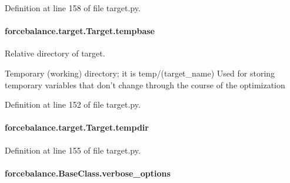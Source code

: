 Definition at line 158 of file target.\-py.

\hypertarget{classforcebalance_1_1target_1_1Target_ae5b544d3e11365865813ef3d626ef81d}{
\paragraph[{tempbase}]{\setlength{\rightskip}{0pt plus 5cm}forcebalance.\-target.\-Target.\-tempbase\hspace{0.3cm}{\ttfamily [inherited]}}}\label{classforcebalance_1_1target_1_1Target_ae5b544d3e11365865813ef3d626ef81d}


Relative directory of target. 

Temporary (working) directory; it is temp/(target\-\_\-name) Used for storing temporary variables that don't change through the course of the optimization 

Definition at line 152 of file target.\-py.

\hypertarget{classforcebalance_1_1target_1_1Target_aa1f01b5b78db253b5b66384ed11ed193}{
\paragraph[{tempdir}]{\setlength{\rightskip}{0pt plus 5cm}forcebalance.\-target.\-Target.\-tempdir\hspace{0.3cm}{\ttfamily [inherited]}}}\label{classforcebalance_1_1target_1_1Target_aa1f01b5b78db253b5b66384ed11ed193}


Definition at line 155 of file target.\-py.

\hypertarget{classforcebalance_1_1BaseClass_afd68efa29ccd2f320f4cf82198214aac}{
\paragraph[{verbose\-\_\-options}]{\setlength{\rightskip}{0pt plus 5cm}forcebalance.\-Base\-Class.\-verbose\-\_\-options\hspace{0.3cm}{\ttfamily [inherited]}}}\label{classforcebalance_1_1BaseClass_afd68efa29ccd2f320f4cf82198214aac}


